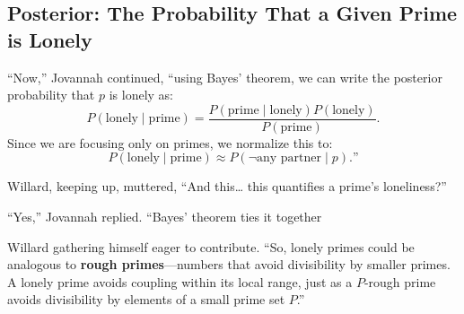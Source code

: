 % 
% 
% 
% 
\subsection{Posterior: The Probability That a Given Prime is Lonely}

“Now,” Jovannah continued, “using Bayes’ theorem, we can write the posterior probability that \( p \) is lonely as:
\[
P(\text{lonely} \mid \text{prime}) = \frac{P(\text{prime} \mid \text{lonely}) P(\text{lonely})}{P(\text{prime})}.
\]
Since we are focusing only on primes, we normalize this to:
\[
P(\text{lonely} \mid \text{prime}) \approx P(\neg \text{any partner} \mid p).”
\]
\bigskip

Willard, keeping up, muttered, “And this… this quantifies a prime's loneliness?”
\bigskip

“Yes,” Jovannah replied. “Bayes’ theorem ties it together
\bigskip

Willard gathering himself eager to contribute. “So, lonely primes could be analogous to \textbf{rough primes}—numbers that avoid divisibility by smaller primes. A lonely prime avoids coupling within its local range, just as a \( P \)-rough prime avoids divisibility by elements of a small prime set \( P \).”
\bigskip

